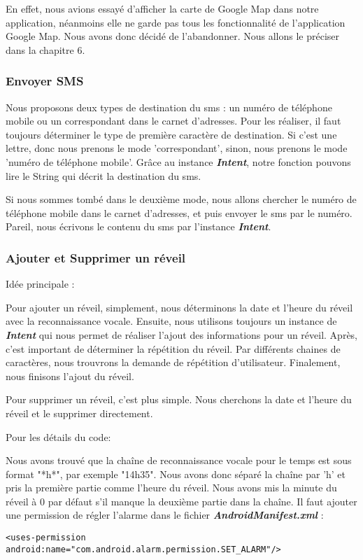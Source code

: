 \indent En effet, nous avions essayé d'afficher la carte de Google Map dans notre application, néanmoins elle ne garde pas tous les fonctionnalité de l'application Google Map. Nous avons donc décidé de l'abandonner. Nous allons le préciser dans la chapitre 6.

\subsubsection{Envoyer SMS}
\indent Nous proposons deux types de destination du sms : un numéro de téléphone mobile ou un correspondant dans le carnet d'adresses.  Pour les réaliser, il faut toujours déterminer le type de première caractère de destination. Si c'est une lettre, donc nous prenons le mode 'correspondant', sinon, nous prenons le mode 'numéro de téléphone mobile'. Grâce au instance \textbf{\emph{Intent}}, notre fonction pouvons lire le String qui décrit la destination du sms. 

\indent Si nous sommes tombé dans le deuxième mode, nous allons chercher le numéro de téléphone mobile dans le carnet d'adresses, et puis envoyer le sms par le numéro.\\

\indent Pareil, nous écrivons le contenu du sms par l'instance \textbf{\emph{Intent}}.
	
\subsubsection{Ajouter et Supprimer un réveil}
\indent Idée principale :

\indent Pour ajouter un réveil, simplement, nous déterminons la date et l'heure du réveil avec la reconnaissance vocale. Ensuite, nous utilisons toujours un instance de \textbf{\emph{Intent}} qui nous permet de réaliser l'ajout des informations pour un réveil. Après, c'est important de déterminer la répétition du réveil. Par différents chaines de caractères, nous trouvrons la demande de répétition d'utilisateur. Finalement, nous finisons l'ajout du réveil.

\indent Pour supprimer un réveil, c'est plus simple. Nous cherchons la date et l'heure du réveil et le supprimer directement.

\indent Pour les détails du code: 

\indent Nous avons trouvé que la chaîne de reconnaissance vocale pour le temps est sous format "*h*", par exemple "14h35". Nous avons donc séparé la chaîne par 'h' et pris la première partie comme l'heure du réveil. Nous avons mis la minute du réveil à 0 par défaut s'il manque la deuxième partie dans la chaîne. Il faut ajouter une permission de régler l'alarme dans le fichier \textbf{\emph{AndroidManifest.xml}} : \\
	\begin{lstlisting}[frame=none,aboveskip=-0.5em,basicstyle=\footnotesize\bfseries]
	<uses-permission android:name="com.android.alarm.permission.SET_ALARM"/>
	\end{lstlisting}

